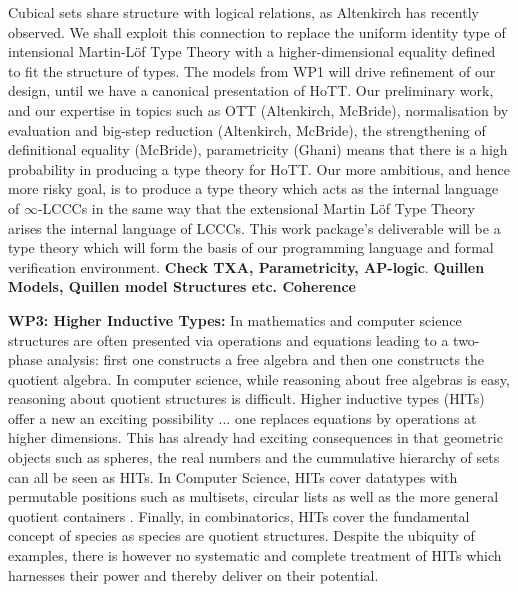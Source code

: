 \documentclass[a4paper,11pt]{article}
\begin{document}

Cubical sets share structure with logical relations, as Altenkirch has
recently observed. We shall exploit this connection to replace the
uniform identity type of intensional Martin-L\"of Type Theory with a
higher-dimensional equality defined to fit the structure of types. The
models from WP1 will drive refinement of our design, until we have a
canonical presentation of HoTT. Our preliminary work, and our
expertise in topics such as OTT (Altenkirch, McBride), normalisation
by evaluation and big-step reduction (Altenkirch, McBride), the
strengthening of definitional equality (McBride), parametricity
(Ghani) means that there is a high probability in producing a type
theory for HoTT. Our more ambitious, and hence more risky goal, is to
produce a type theory which acts as the internal language of
$\infty$-LCCCs in the same way that the extensional Martin L\"of Type
Theory arises the internal language of LCCCs.  This work package's
deliverable will be a type theory which will form the basis of our
programming language and formal verification environment. {\bf Check
  TXA, Parametricity, AP-logic}.  {\bf Quillen Models, Quillen model
  Structures etc. Coherence}


{\bf WP3: Higher Inductive Types:} In mathematics and computer science
structures are often presented via operations and equations leading to
a two-phase analysis: first one constructs a free algebra and then one
constructs the quotient algebra. In computer science, while reasoning
about free algebras is easy, reasoning about quotient structures is
difficult. Higher inductive types (HITs) offer a new an exciting
possibility ... one replaces equations by operations at higher
dimensions. This has already had exciting consequences in that
geometric objects such as spheres, the real numbers and the
cummulative hierarchy of sets can all be seen as HITs.  In Computer
Science, HITs cover datatypes with permutable positions such as
multisets, circular lists as well as the more general quotient
containers \cite{abottAltenGhaniMcB:quotientContainers, EPSRC
  Containers}. Finally, in combinatorics, HITs cover the fundamental
concept of species as species are quotient structures. Despite the
ubiquity of examples, there is however no systematic and complete
treatment of HITs which harnesses their power and thereby deliver on
their potential.
\end{document}
